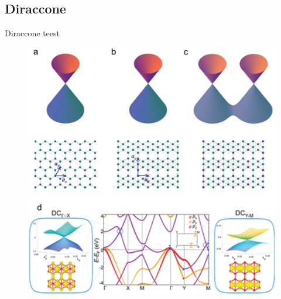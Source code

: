 \documentclass[handout,t]{beamer}
\begin{document}
\subsection{Diraccone}
\begin{frame}{Diraccone}
	teest
	\begin{figure}
		\centering
		\includegraphics[width=0.5\linewidth]{../figures/Diraccone.png}
	\end{figure}
\end{frame}
\end{document}
